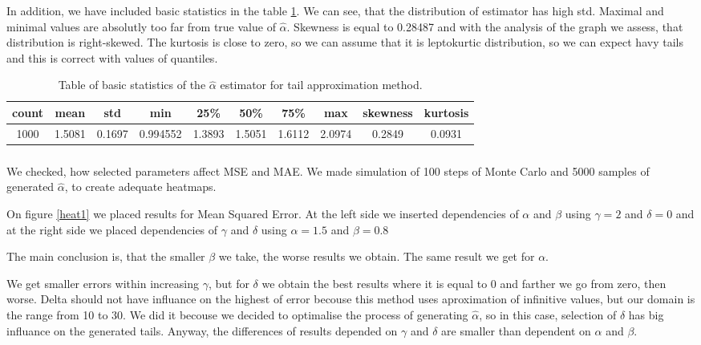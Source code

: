 \documentclass{article}
\begin{document}
		In addition, we have included basic statistics in the table \ref{tabelka1}. We can see, that the distribution of estimator has high std.  Maximal and minimal values are absolutly too far from true value of $\hat\alpha$. Skewness is equal to 0.28487 and with the analysis of the graph we assess, that distribution is right-skewed. The kurtosis is close to zero, so we can assume that it is leptokurtic distribution, so we can expect havy tails and this is correct with values of quantiles.
		
		\begin{table}[H]
			\centering
			\begin{tabular}{|c|c|c|c|c|c|c|c|c|c|}
				\hline
				count &      mean &       std &       min &     25\% &       50\% &     75\% &      max & skewness & kurtosis \\\hline
				1000 & 1.5081 &  0.1697 &  0.994552 &  1.3893 &  1.5051 &  1.6112 &  2.0974 & 0.2849 & 0.0931\\\hline
			\end{tabular}
			\caption{Table of basic statistics of the $\hat\alpha$ estimator for tail approximation method.}\label{tabelka1}
		\end{table}
		\subsubsection{}
		We checked, how selected parameters affect MSE and MAE. We made simulation of 100 steps of Monte Carlo and 5000 samples of generated $\hat\alpha$, to create adequate heatmaps.
		
		On figure \ref{heat1} we placed results for Mean Squared Error. At the left side we inserted dependencies of $\alpha$ and $\beta$ using $\gamma=2$ and $\delta=0$ and at the right side we placed dependencies of $\gamma$ and $\delta$ using $\alpha=1.5$ and $\beta=0.8$
		
		The main conclusion is, that the smaller $\beta$ we take, the worse results we obtain. The same result we get for $\alpha$. 
		
		We get smaller errors within increasing $\gamma$, but for $\delta$ we obtain the best results where it is equal to 0 and farther we go from zero, then worse. Delta should not have influance on the highest of error becouse this method uses aproximation of infinitive values, but our domain is the range from 10 to 30. We did it becouse we decided to optimalise the process of generating $\hat\alpha$, so in this case, selection of $\delta$ has big influance on the generated tails. Anyway, the differences of results depended on $\gamma$ and $\delta$ are smaller than dependent on $\alpha$ and $\beta$.
		
\end{document}
